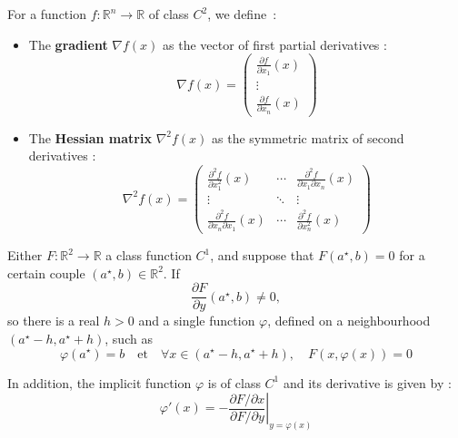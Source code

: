 \begin{f}
	For a function \( f : \mathbb{R}^n \rightarrow \mathbb{R} \) of class \( C^2 \), we define :
	
	\begin{itemize}
		\item The \textbf{gradient} \( \nabla f(x) \) as the vector of first partial derivatives :
		$$
		\nabla f(x) = 
		\begin{pmatrix}
			\frac{\partial f}{\partial x_1}(x) \\
			\vdots \\
			\frac{\partial f}{\partial x_n}(x)
		\end{pmatrix}
		$$
		
		\item The \textbf{Hessian matrix} \( \nabla^2 f(x) \) as the symmetric matrix of second derivatives :
		$$
		\nabla^2 f(x) =
		\begin{pmatrix}
			\frac{\partial^2 f}{\partial x_1^2}(x) & \cdots & \frac{\partial^2 f}{\partial x_1 \partial x_n}(x) \\
			\vdots & \ddots & \vdots \\
			\frac{\partial^2 f}{\partial x_n \partial x_1}(x) & \cdots & \frac{\partial^2 f}{\partial x_n^2}(x)
		\end{pmatrix}
		$$
	\end{itemize}
	
\end{f}

\begin{f}
	Either \( F : \mathbb{R}^2 \rightarrow \mathbb{R} \) a class function \( C^1 \), and suppose that \( F(a^\star, b) = 0 \) for a certain couple \( (a^\star, b) \in \mathbb{R}^2 \). If
	\[
	\frac{\partial F}{\partial y}(a^\star, b) \neq 0,
	\]
	so there is a real \( h > 0 \) and a single function \( \varphi \), defined on a neighbourhood \( (a^\star - h, a^\star + h) \), such as
	\[
	\varphi(a^\star) = b \quad \text{et} \quad \forall x \in (a^\star - h, a^\star + h), \quad F(x, \varphi(x)) = 0
	\]
	
	In addition, the implicit function \( \varphi \) is of class \( C^1 \) and its derivative is given by :
	\[
	\varphi'(x) = - \left. \frac{\partial F / \partial x}{\partial F / \partial y} \right|_{y = \varphi(x)}
	\]
	

\end{f}
